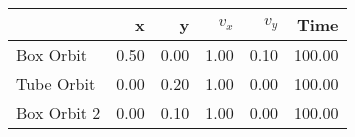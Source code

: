 \begin{tabular}{lrrrrr}
\toprule
{} &    x &    y &  $v_x$ &  $v_y$ &   Time \\
\midrule
Box Orbit   & 0.50 & 0.00 &   1.00 &   0.10 & 100.00 \\
Tube Orbit  & 0.00 & 0.20 &   1.00 &   0.00 & 100.00 \\
Box Orbit 2 & 0.00 & 0.10 &   1.00 &   0.00 & 100.00 \\
\bottomrule
\end{tabular}

